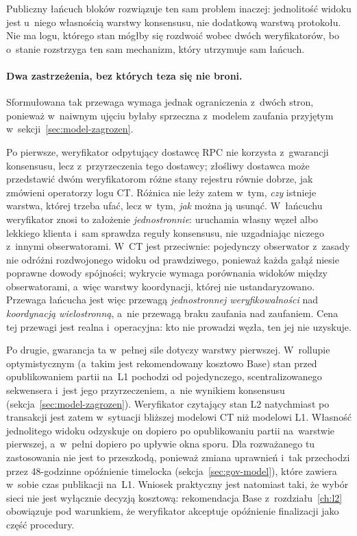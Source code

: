 Publiczny łańcuch bloków rozwiązuje ten sam problem inaczej: jednolitość widoku
jest u~niego własnością warstwy konsensusu, nie dodatkową warstwą protokołu.
Nie ma logu, którego stan mógłby się rozdwoić wobec dwóch weryfikatorów, bo
o~stanie rozstrzyga ten sam mechanizm, który utrzymuje sam łańcuch.

\paragraph{Dwa zastrzeżenia, bez których teza się nie broni.} Sformułowana tak
przewaga wymaga jednak ograniczenia z~dwóch stron, ponieważ w~naiwnym ujęciu
byłaby sprzeczna z~modelem zaufania przyjętym w~sekcji~\ref{sec:model-zagrozen}.

Po pierwsze, weryfikator odpytujący dostawcę RPC nie korzysta z~gwarancji
konsensusu, lecz z~przyrzeczenia tego dostawcy; złośliwy dostawca może
przedstawić dwóm weryfikatorom różne stany rejestru równie dobrze, jak
zmówieni operatorzy logu CT. Różnica nie leży zatem w~tym, \emph{czy} istnieje
warstwa, której trzeba ufać, lecz w~tym, \emph{jak} można ją usunąć.
W~łańcuchu weryfikator znosi to założenie \emph{jednostronnie}: uruchamia własny
węzeł albo lekkiego klienta i~sam sprawdza reguły konsensusu, nie uzgadniając
niczego z~innymi obserwatorami. W~CT jest przeciwnie: pojedynczy obserwator
z~zasady nie odróżni rozdwojonego widoku od prawdziwego, ponieważ każda gałąź
niesie poprawne dowody spójności; wykrycie wymaga porównania widoków między
obserwatorami, a~więc warstwy koordynacji, której nie ustandaryzowano. Przewaga
łańcucha jest więc przewagą \emph{jednostronnej weryfikowalności} nad
\emph{koordynacją wielostronną}, a~nie przewagą braku zaufania nad zaufaniem.
Cena tej przewagi jest realna i~operacyjna: kto nie prowadzi węzła, ten jej nie
uzyskuje.

Po drugie, gwarancja ta w~pełnej sile dotyczy warstwy pierwszej. W~rollupie
optymistycznym (a~takim jest rekomendowany kosztowo Base) stan przed
opublikowaniem partii na~L1 pochodzi od pojedynczego, scentralizowanego
sekwensera i~jest jego przyrzeczeniem, a~nie wynikiem konsensusu
(sekcja~\ref{sec:model-zagrozen}). Weryfikator czytający stan L2 natychmiast po
transakcji jest zatem w~sytuacji bliższej modelowi CT niż modelowi L1.
Własność jednolitego widoku odzyskuje on dopiero po opublikowaniu partii
na~warstwie pierwszej, a~w~pełni dopiero po upływie okna sporu. Dla rozważanego tu
zastosowania nie jest to przeszkodą, ponieważ zmiana uprawnień i~tak przechodzi
przez 48-godzinne opóźnienie timelocka (sekcja~\ref{sec:gov-model}), które
zawiera w~sobie czas publikacji na~L1. Wniosek praktyczny jest natomiast taki,
że wybór sieci nie jest wyłącznie decyzją kosztową: rekomendacja Base
z~rozdziału~\ref{ch:l2} obowiązuje pod warunkiem, że weryfikator akceptuje
opóźnienie finalizacji jako część procedury.

